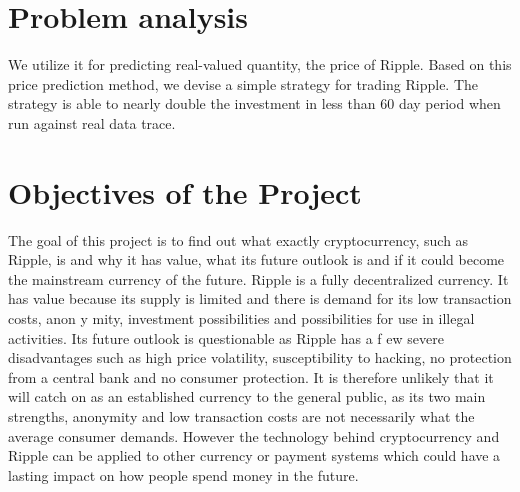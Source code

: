 \section{Problem analysis}

We utilize it for predicting real-valued quantity, the price of Ripple. Based on
this  price  prediction  method,  we  devise  a  simple
strategy for trading Ripple. The strategy is able
to nearly double the investment in less than 60 day
period when run against real data trace.


\section{Objectives of the Project}
The  goal of this project is to find out what exactly cryptocurrency, such as Ripple, is and why it has value, what its future outlook is and if it could become the mainstream currency of the future. 
Ripple is a fully 
decentralized
currency. It has value because its supply is limited 
and  there  is  demand  for  its  low  transaction  costs,  anon
y
mity,  investment  possibilities  and 
possibilities
for use in illegal activities. Its future outlook is questionable as Ripple has a f
ew 
severe disadvantages such as high price volatility, 
susceptibility
to
hacking, 
no protection from 
a central bank
and no consumer protection. 
It is 
therefore 
unlikely that it will catch on as an 
established  currency  to  the  general  public,  as  its  two  main  strengths,  anonymity  and  low 
transaction  costs  are  not  necessarily  what  the  average  consumer  demands. 
However  the 
technology
behind  cryptocurrency  and  Ripple 
can  be  applied  to  other  currency  or  payment 
systems which could 
have a lasting impact on how
people spend money in the future.
